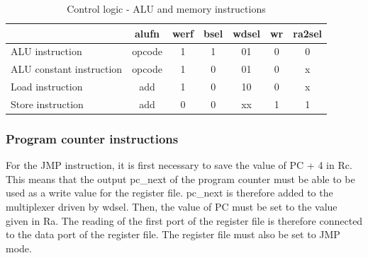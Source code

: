 \begin{table}[H]
    \centering
    \begin{tabular}{|l|c|c|c|c|c|c|}
    \hline
    \rowcolor[HTML]{DAE8FC} 
    \multicolumn{1}{|c|}{\cellcolor[HTML]{DAE8FC}\textbf{Instruction}} & \textbf{alufn} & \textbf{werf} & \textbf{bsel} & \multicolumn{1}{l|}{\cellcolor[HTML]{DAE8FC}\textbf{wdsel}} & \multicolumn{1}{l|}{\cellcolor[HTML]{DAE8FC}\textbf{wr}} & \multicolumn{1}{l|}{\cellcolor[HTML]{DAE8FC}\textbf{ra2sel}} \\ \hline
    ALU instruction                                                    & opcode         & 1             & 1             & 01                                                          & 0                                                        & 0                                                            \\ \hline
    ALU constant instruction                                           & opcode         & 1             & 0             & 01                                                          & 0                                                        & x                                                            \\ \hline
    Load instruction                                                   & add            & 1             & 0             & 10                                                          & 0                                                        & x                                                            \\ \hline
    Store instruction                                                  & add            & 0             & 0             & xx                                                          & 1                                                        & 1                                                            \\ \hline
    \end{tabular}
    \caption{Control logic - ALU and memory instructions}
    \label{tab:cl/dm}
\end{table}

\subsubsection*{Program counter instructions}

For the JMP instruction, it is first necessary to save the value of PC + 4 in Rc. This means that 
the output pc\_next of the program counter must be able to be used as
a write value for the register 
file. pc\_next is therefore added to the multiplexer driven by wdsel. Then, the value of PC must be 
set to the value given in Ra. The reading of the first port of the register file is therefore 
connected to the data port of the register file. The register file must also be set to JMP mode.

